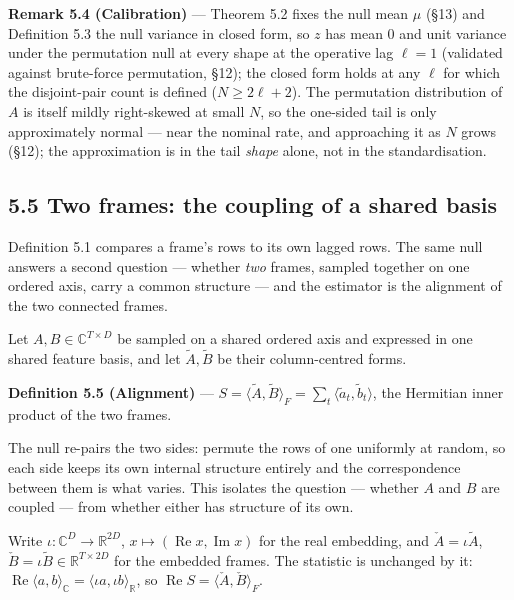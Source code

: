 \documentclass[10pt,letterpaper,twocolumn]{article}
\begin{document}

\textbf{Remark 5.4 (Calibration)} --- Theorem 5.2 fixes the null mean \(\mu\) (§13) and Definition 5.3 the null variance in closed form, so \(z\) has mean \(0\) and unit variance under the permutation null at every shape at the operative lag \(\ell=1\) (validated against brute-force permutation, §12); the closed form holds at any \(\ell\) for which the disjoint-pair count is defined (\(N\ge 2\ell+2\)). The permutation distribution of \(A\) is itself mildly right-skewed at small \(N\), so the one-sided tail is only approximately normal --- near the nominal rate, and approaching it as \(N\) grows (§12); the approximation is in the tail \emph{shape} alone, not in the standardisation.

\subsection{5.5 Two frames: the coupling of a shared basis}\label{55-two-frames-the-coupling-of-a-shared-basis}

Definition 5.1 compares a frame's rows to its own lagged rows. The same null answers a second question --- whether \emph{two} frames, sampled together on one ordered axis, carry a common structure --- and the estimator is the alignment of the two connected frames.

Let \(A,B\in\mathbb{C}^{T\times D}\) be sampled on a shared ordered axis and expressed in one shared feature basis, and let \(\tilde A,\tilde B\) be their column-centred forms.

\textbf{Definition 5.5 (Alignment)} --- \(S=\langle\tilde A,\tilde B\rangle_F=\sum_{t}\langle\tilde a_t,\tilde b_t\rangle\), the Hermitian inner product of the two frames.

The null re-pairs the two sides: permute the rows of one uniformly at random, so each side keeps its own internal structure entirely and the correspondence between them is what varies. This isolates the question --- whether \(A\) and \(B\) are coupled --- from whether either has structure of its own.

Write \(\iota:\mathbb{C}^D\to\mathbb{R}^{2D}\), \(x\mapsto(\operatorname{Re}x,\operatorname{Im}x)\) for the real embedding, and \(\check A=\iota\tilde A\), \(\check B=\iota\tilde B\in\mathbb{R}^{T\times 2D}\) for the embedded frames. The statistic is unchanged by it: \(\operatorname{Re}\langle a,b\rangle_{\mathbb C}=\langle\iota a,\iota b\rangle_{\mathbb R}\), so \(\operatorname{Re}S=\langle\check A,\check B\rangle_F\).
\end{document}
